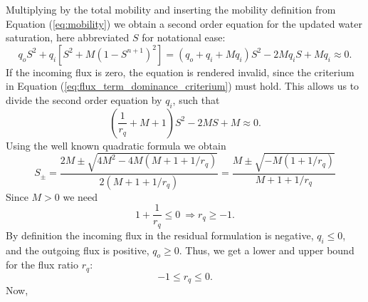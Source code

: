 Multiplying by the total mobility and inserting the mobility definition from Equation (\ref{eq:mobility}) we obtain a second order equation for the updated water saturation, here abbreviated $S$ for notational ease:
\begin{equation*}
 q_o S^2 + q_i \left[ S^2 + M (1-S^{n+1})^2 \right]  =  (q_o + q_i + M q_i) S^2 - 2 M q_i S + Mq_i  \approx 0.
\end{equation*}
If the incoming flux is zero, the equation is rendered invalid, since the criterium in Equation (\ref{eq:flux_term_dominance_criterium}) must hold. This allows us to divide the second order equation by $q_i$, such that
\begin{equation*}
\left(\frac{1}{r_q} + M + 1\right) S^2 - 2 M S + M  \approx 0.
\end{equation*}
Using the well known quadratic formula we obtain
\begin{equation*}
S_{\pm} = \frac{ 2M \pm \sqrt{4M^2 - 4 M (M+1+1/r_q)} }{2 (M + 1 + 1/r_q)} = \frac{ M \pm \sqrt{-M(1 + 1/r_q) } }{ M + 1 + 1/r_q } 
\end{equation*}
Since $M > 0$ we need 
\begin{equation*}
1 + \frac{1}{r_q} \leq 0 ~ \Rightarrow r_q \geq -1.
\end{equation*}
By definition the incoming flux in the residual formulation is negative, $q_i \leq 0$, and the outgoing flux is positive, $q_o \geq 0$. Thus, we get a lower and upper bound for the flux ratio $r_q$:
\begin{equation} \label{eq:flux_ratio_bound}
-1 \leq r_q \leq 0.
\end{equation}
Now, 

